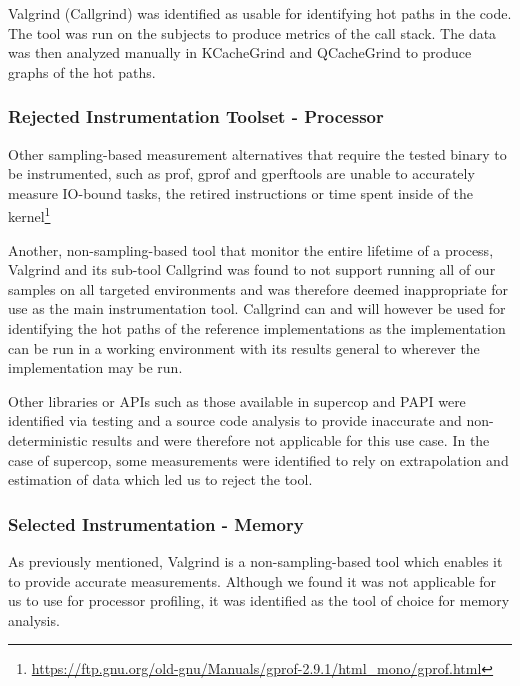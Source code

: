 Valgrind (Callgrind) was identified as usable for identifying hot paths in the code. The tool was run on the subjects to produce metrics of the call stack. The data was then analyzed manually in KCacheGrind and QCacheGrind to produce graphs of the hot paths.

\subsubsection{Rejected Instrumentation Toolset - Processor}
\label{section:method:experiment:phase1:rejected-toolset-processor}
Other sampling-based measurement alternatives that require the tested binary to be instrumented, such as prof, gprof and gperftools are unable to accurately measure IO-bound tasks, the retired instructions or time spent inside of the kernel\footnote{\href{https://ftp.gnu.org/old-gnu/Manuals/gprof-2.9.1/html\_mono/gprof.html}{https://ftp.gnu.org/old-gnu/Manuals/gprof-2.9.1/html\_mono/gprof.html}}

Another, non-sampling-based tool that monitor the entire lifetime of a process, Valgrind and its sub-tool Callgrind was found to not support running all of our samples on all targeted environments and was therefore deemed inappropriate for use as the main instrumentation tool. Callgrind can and will however be used for identifying the hot paths of the reference implementations as the implementation can be run in a working environment with its results general to wherever the implementation may be run.

Other libraries or APIs such as those available in \gls{supercop} and PAPI were identified via testing and a source code analysis to provide inaccurate and non-deterministic results and were therefore not applicable for this use case. In the case of \gls{supercop}, some measurements were identified to rely on extrapolation and estimation of data which led us to reject the tool.

\subsubsection{Selected Instrumentation - Memory}
\label{section:method:experiment:phase1:selected-toolset-memory}
As previously mentioned, Valgrind is a non-sampling-based tool which enables it to provide accurate measurements. Although we found it was not applicable for us to use for processor profiling, it was identified as the tool of choice for memory analysis.

